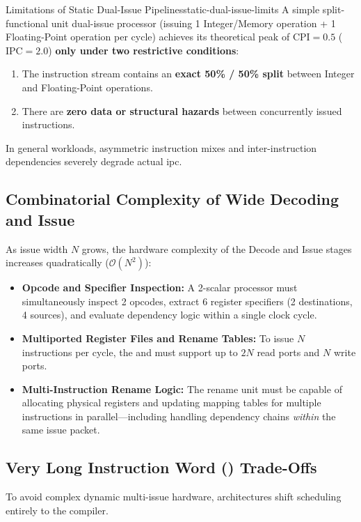 \begin{observation}{Limitations of Static Dual-Issue Pipelines}{static-dual-issue-limits}
A simple split-functional unit dual-issue processor (issuing 1 Integer/Memory operation + 1 Floating-Point operation per cycle) achieves its theoretical peak of $\text{CPI} = 0.5$ ($\text{IPC} = 2.0$) \textbf{only under two restrictive conditions}:
\begin{enumerate}
    \item The instruction stream contains an \textbf{exact 50\% / 50\% split} between Integer and Floating-Point operations.
    \item There are \textbf{zero data or structural hazards} between concurrently issued instructions.
\end{enumerate}
In general workloads, asymmetric instruction mixes and inter-instruction dependencies severely degrade actual \gls{ipc}.
\end{observation}

\subsection{Combinatorial Complexity of Wide Decoding and Issue}
As issue width $N$ grows, the hardware complexity of the Decode and Issue stages increases quadratically ($\mathcal{O}(N^2)$):
\begin{itemize}
    \item \textbf{Opcode and Specifier Inspection:} A 2-scalar processor must simultaneously inspect 2 opcodes, extract 6 register specifiers (2 destinations, 4 sources), and evaluate dependency logic within a single clock cycle.
    \item \textbf{Multiported Register Files and Rename Tables:} To issue $N$ instructions per cycle, the  and  must support up to $2N$ read ports and $N$ write ports.
    \item \textbf{Multi-Instruction Rename Logic:} The rename unit must be capable of allocating physical registers and updating mapping tables for multiple instructions in parallel—including handling dependency chains \textit{within} the same issue packet.
\end{itemize}

\subsection{Very Long Instruction Word () Trade-Offs}
To avoid complex dynamic multi-issue hardware, \textbf{} architectures shift scheduling entirely to the compiler.

